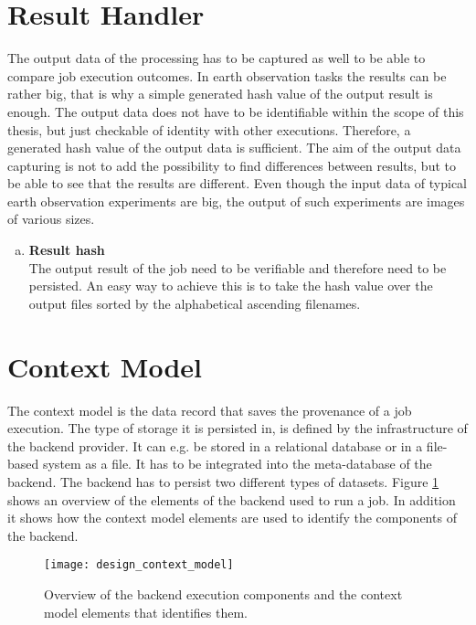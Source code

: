 \documentclass[draft,final]{vutinfth} %
\begin{document}
\section{Result Handler}\label{Design:Result Handler}
The output data of the processing has to be captured as well to be able to compare job execution outcomes. In earth observation tasks the results can be rather big, that is why a simple generated hash value of the output result is enough. The output data does not have to be identifiable within the scope of this thesis, but just checkable of identity with other executions. Therefore, a generated hash value of the output data is sufficient. The aim of the output data capturing is not to add the possibility to find differences between results, but to be able to see that the results are different. Even though the input data of typical earth observation experiments are big, the output of such experiments are images of various sizes.   

\begin{enumerate}[(f)]
	\item \textbf{Result hash} \\
	The output result of the job need to be verifiable and therefore need to be persisted. An easy way to achieve this is to take the hash value over the output files sorted by the alphabetical ascending filenames.
\end{enumerate}

 
\section{Context Model}\label{Design:Context Model}

The context model is the data record that saves the provenance of a job execution. The type of storage it is persisted in, is defined by the infrastructure of the backend provider. It can e.g. be stored in a relational database or in a file-based system as a file. It has to be integrated into the meta-database of the backend. The backend has to persist two different types of datasets. Figure \ref{fig:design_contextmodel} shows an overview of the elements of the backend used to run a job. In addition it shows how the context model elements are used to identify the components of the backend.

\begin{figure}[h]
	\centering
	\texttt{[image: design\_context\_model]}
	\caption{Overview of the backend execution components and the context model elements that identifies them.}
	\label{fig:design_contextmodel} 
\end{figure}
\end{document}
